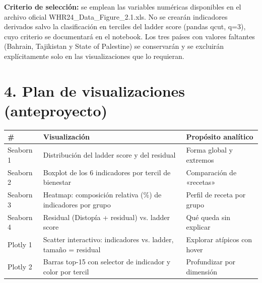 \documentclass[
]{article}
\newcounter{none} %
\begin{document}
\textbf{Criterio de selección:} se emplean las variables numéricas
disponibles en el archivo oficial WHR24\_Data\_Figure\_2.1.xls. No se
crearán indicadores derivados salvo la clasificación en terciles del
ladder score (pandas qcut, q=3), cuyo criterio se documentará en el
notebook. Los tres países con valores faltantes (Bahrain, Tajikistan y
State of Palestine) se conservarán y se excluirán explícitamente solo en
las visualizaciones que lo requieran.

\section{4. Plan de visualizaciones
(anteproyecto)}\label{plan-de-visualizaciones-anteproyecto}

{\def\LTcaptype{none} %
\begin{longtable}[]{@{}
  >{\raggedright\arraybackslash}p{}
  >{\raggedright\arraybackslash}p{}
  >{\raggedright\arraybackslash}p{}@{}}
\toprule\noalign{}
\begin{minipage}[b]{\linewidth}\raggedright
\textbf{\#}
\end{minipage} & \begin{minipage}[b]{\linewidth}\raggedright
\textbf{Visualización}
\end{minipage} & \begin{minipage}[b]{\linewidth}\raggedright
\textbf{Propósito analítico}
\end{minipage} \\
\midrule\noalign{}
\endhead
\bottomrule\noalign{}
\endlastfoot
Seaborn 1 & Distribución del ladder score y del residual & Forma global
y extremos \\
Seaborn 2 & Boxplot de los 6 indicadores por tercil de bienestar &
Comparación de «recetas» \\
Seaborn 3 & Heatmap: composición relativa (\%) de indicadores por grupo
& Perfil de receta por grupo \\
Seaborn 4 & Residual (Distopía + residual) vs. ladder score & Qué queda
sin explicar \\
Plotly 1 & Scatter interactivo: indicadores vs. ladder, tamaño =
residual & Explorar atípicos con hover \\
Plotly 2 & Barras top-15 con selector de indicador y color por tercil &
Profundizar por dimensión \\
\end{longtable}
}
\end{document}
